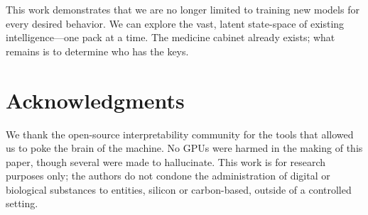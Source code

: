 \documentclass[10pt, twocolumn]{article}
\begin{document}
This work demonstrates that we are no longer limited to training new models for every desired behavior. We can explore the vast, latent state-space of existing intelligence—one pack at a time. The medicine cabinet already exists; what remains is to determine who has the keys.

\section*{Acknowledgments}
We thank the open-source interpretability community for the tools that allowed us to poke the brain of the machine. No GPUs were harmed in the making of this paper, though several were made to hallucinate. This work is for research purposes only; the authors do not condone the administration of digital or biological substances to entities, silicon or carbon-based, outside of a controlled setting.
\end{document}
